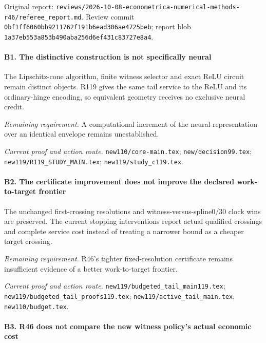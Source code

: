 Original report: \nolinkurl{reviews/2026-10-08-econometrica-numerical-methods-r46/referee_report.md}. Review commit \nolinkurl{0bf1ff6060bb9211762f191b6ead306ae4725beb}; report blob \nolinkurl{1a37eb553a853b490aba256d6ef431c83727e8a4}.

\paragraph{B1. The distinctive construction is not specifically neural}

The Lipschitz-cone algorithm, finite witness selector and exact ReLU circuit remain distinct objects. R119 gives the same tail service to the ReLU and its ordinary-hinge encoding, so equivalent geometry receives no exclusive neural credit.

\par\emph{Remaining requirement.} A computational increment of the neural representation over an identical envelope remains unestablished.

\par\emph{Current proof and action route.} \nolinkurl{new110/core-main.tex}; \nolinkurl{new/decision99.tex}; \nolinkurl{new119/R119_STUDY_MAIN.tex}; \nolinkurl{new119/study_c119.tex}.

\paragraph{B2. The certificate improvement does not improve the declared work-to-target frontier}

The unchanged first-crossing resolutions and witness-versus-spline0/30 clock wins are preserved. The current stopping interventions report actual qualified crossings and complete service cost instead of treating a narrower bound as a cheaper target crossing.

\par\emph{Remaining requirement.} R46's tighter fixed-resolution certificate remains insufficient evidence of a better work-to-target frontier.

\par\emph{Current proof and action route.} \nolinkurl{new119/budgeted_tail_main119.tex}; \nolinkurl{new119/budgeted_tail_proofs119.tex}; \nolinkurl{new119/active_tail_main.tex}; \nolinkurl{new110/budget.tex}.

\paragraph{B3. R46 does not compare the new witness policy’s actual economic cost}

